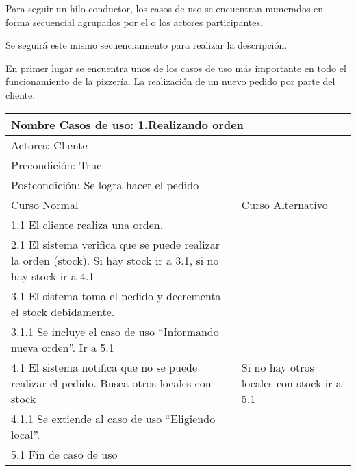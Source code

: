 \documentclass[a4paper,10pt]{article}
\begin{document}
Para seguir un hilo conductor, los casos de uso se encuentran numerados en forma secuencial agrupados por el o los actores participantes.

Se seguir\'a este mismo secuenciamiento para realizar la descripci\'on.

\bigskip


En primer lugar se encuentra unos de los casos de uso m\'as importante en todo el funcionamiento de la pizzer\'ia. La realizaci\'on de un nuevo
pedido por parte del cliente.


\begin{center}
\begin{tabularx}{14cm}{|X|X|}
\hline
\multicolumn{2}{|l|}{Nombre Casos de uso: 1.Realizando orden}\\
\hline
\multicolumn{2}{|l|}{Actores: Cliente}\\
\hline
\multicolumn{2}{|l|}{Precondici\'on: True}\\
\hline
\multicolumn{2}{|l|}{Postcondici\'on: Se logra hacer el pedido}\\
\hline
Curso Normal & Curso Alternativo\\
\hline
1.1 El cliente realiza una orden. & 
\\
\hline
2.1 El sistema verifica que se puede realizar la orden (stock). Si hay stock ir a 3.1, si no hay stock ir a 4.1&
\\
\hline
3.1 El sistema toma el pedido y decrementa el stock debidamente. &
\\
\hline
3.1.1 Se incluye el caso de uso ``Informando nueva orden''. Ir a 5.1 &
\\
\hline
4.1 El sistema notifica que no se puede realizar el pedido. Busca otros locales con stock & Si no hay otros locales con stock ir a 5.1
\\
\hline
4.1.1 Se extiende al caso de uso ``Eligiendo local''. &
\\
\hline
5.1 Fin de caso de uso & \\
\hline
\end{tabularx}
\end{center}


\bigskip
\end{document}
